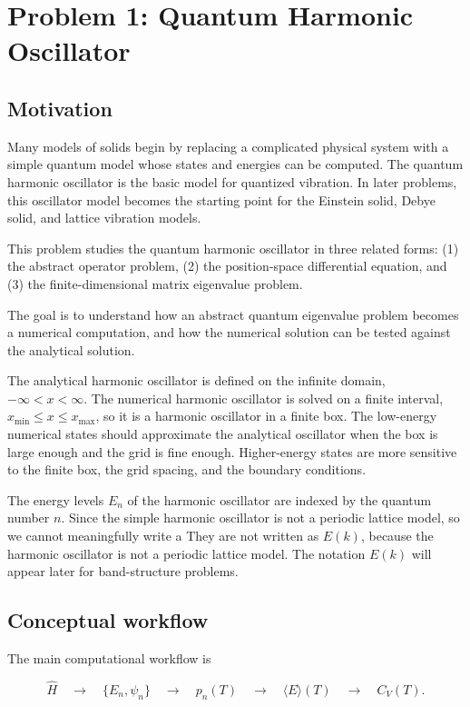 \section{Problem 1: Quantum Harmonic Oscillator}

\subsection{Motivation}

Many models of solids begin by replacing a complicated physical system with a simple quantum model whose states and energies can be computed. The quantum harmonic oscillator is the basic model for quantized vibration. In later problems, this oscillator model becomes the starting point for the Einstein solid, Debye solid, and lattice vibration models.

This problem studies the quantum harmonic oscillator in three related forms: 
(1) the abstract operator problem, 
(2) the position-space differential equation, and
(3) the finite-dimensional matrix eigenvalue problem.

The goal is to understand how an abstract quantum eigenvalue problem becomes a numerical computation, and how the numerical solution can be tested against the analytical solution.

The analytical harmonic oscillator is defined on the infinite domain, \(-\infty < x < \infty\). The numerical harmonic oscillator is solved on a finite interval, \(x_{\min} \le x \le x_{\max}\), so it is a harmonic oscillator in a finite box. The low-energy numerical states should approximate the analytical oscillator when the box is large enough and the grid is fine enough. Higher-energy states are more sensitive to the finite box, the grid spacing, and the boundary conditions.

The energy levels \(E_n\) of the harmonic oscillator are indexed by the quantum number \(n\).  Since the simple harmonic oscillator is not a periodic lattice model, so we cannot meaningfully write a They are not written as \(E(k)\), because the harmonic oscillator is not a periodic lattice model. The notation \(E(k)\) will appear later for band-structure problems.

\subsection{Conceptual workflow}

The main computational workflow is

\[
\hat{H}
\quad\longrightarrow\quad
\{E_n,\psi_n\}
\quad\longrightarrow\quad
p_n(T)
\quad\longrightarrow\quad
\langle E\rangle(T)
\quad\longrightarrow\quad
C_V(T).
\]

